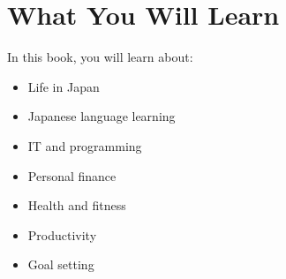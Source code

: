 \section{What You Will Learn}

In this book, you will learn about:

\begin{itemize}
    \item Life in Japan
    \item Japanese language learning
    \item IT and programming
    \item Personal finance
    \item Health and fitness
    \item Productivity
    \item Goal setting
\end{itemize}